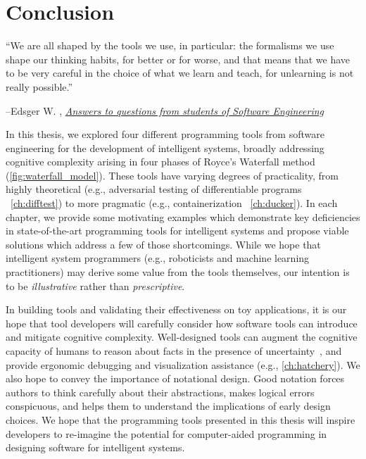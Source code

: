 \chapter{Conclusion}\label{ch:conclusion}
\setlength{\epigraphwidth}{0.90\textwidth}
\epigraph{``We are all shaped by the tools we use, in particular: the formalisms we use shape our thinking habits, for better or for worse, and that means that we have to be very careful in the choice of what we learn and teach, for unlearning is not really possible.''}{\begin{flushright}--Edsger W. \citet{dijkstra2000answers}, \href{https://www.cs.utexas.edu/~EWD/transcriptions/EWD13xx/EWD1305.html}{\textit{Answers to questions from students of Software Engineering}}\end{flushright}}

In this thesis, we explored four different programming tools from software engineering for the development of intelligent systems, broadly addressing cognitive complexity arising in four phases of Royce's Waterfall method (\autoref{fig:waterfall_model}). These tools have varying degrees of practicality, from highly theoretical (e.g., adversarial testing of differentiable programs ~\autoref{ch:difftest}) to more pragmatic (e.g., containerization ~\autoref{ch:ducker}). In each chapter, we provide some motivating examples which demonstrate key deficiencies in state-of-the-art programming tools for intelligent systems and propose viable solutions which address a few of those shortcomings. While we hope that intelligent system programmers (e.g., roboticists and machine learning practitioners) may derive some value from the tools themselves, our intention is to be \textit{illustrative} rather than \textit{prescriptive}.

In building tools and validating their effectiveness on toy applications, it is our hope that tool developers will carefully consider how software tools can introduce and mitigate cognitive complexity. Well-designed tools can augment the cognitive capacity of humans to reason about facts in the presence of uncertainty~\citep{famelis2012partial}, and provide ergonomic debugging and visualization assistance (e.g., \autoref{ch:hatchery}). We also hope to convey the importance of notational design. Good notation forces authors to think carefully about their abstractions, makes logical errors conspicuous, and helps them to understand the implications of early design choices. We hope that the programming tools presented in this thesis will inspire developers to re-imagine the potential for computer-aided programming in designing software for intelligent systems.

